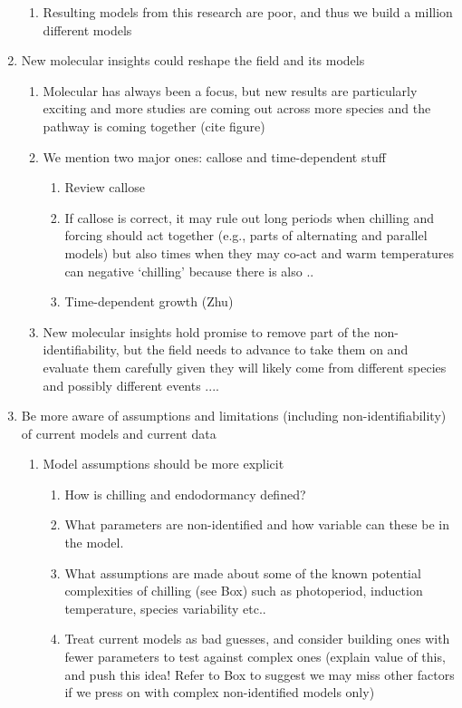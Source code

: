 \documentclass[11pt,letter]{article}
\begin{document}
\begin{enumerate}
\begin{enumerate}
\item Resulting models from this research are poor, and thus we build a million different models
\end{enumerate}
\item New molecular insights could reshape the field and its models 
\begin{enumerate}
\item Molecular has always been a focus, but new results are particularly exciting and more studies are coming out across more species and the pathway is coming together (cite figure)
\item We mention two major ones: callose and time-dependent stuff
\begin{enumerate}
\item Review callose
\item If callose is correct, it may rule out long periods when chilling and forcing should act together (e.g., parts of alternating and parallel models) but also times when they may co-act and warm temperatures can negative `chilling' because there is also .. 
\item Time-dependent growth (Zhu)
\end{enumerate}
\item New molecular insights hold promise to remove part of the non-identifiability, but the field needs to advance to take them on and evaluate them carefully given they will likely come from different species and possibly different events ....
\end{enumerate}
\item Be more aware of assumptions and limitations (including non-identifiability) of current models and current data
\begin{enumerate}
\item Model assumptions should be more explicit
\begin{enumerate}
\item How is chilling and endodormancy defined? 
\item What parameters are non-identified and how variable can these be in the model.
\item What assumptions are made about some of the known potential complexities of chilling (see Box) such as photoperiod, induction temperature, species variability etc..
\item Treat current models as bad guesses, and consider building ones with fewer parameters to test against complex ones (explain value of this, and push this idea! Refer to Box to suggest we may miss other factors if we press on with complex non-identified models only)

\end{enumerate}
\end{enumerate}
\end{enumerate}
\end{document}
